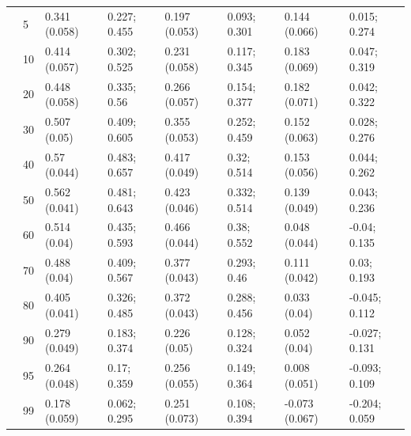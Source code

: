 \begin{landscape}
\begin{table}
{\begin{tabular}[t]{llllllll}
 & 5 & 0.341 (0.058) & 0.227; 0.455 & 0.197 (0.053) & 0.093; 0.301 & 0.144 (0.066) & 0.015; 0.274\\
 & 10 & 0.414 (0.057) & 0.302; 0.525 & 0.231 (0.058) & 0.117; 0.345 & 0.183 (0.069) & 0.047; 0.319\\
 & 20 & 0.448 (0.058) & 0.335; 0.56 & 0.266 (0.057) & 0.154; 0.377 & 0.182 (0.071) & 0.042; 0.322\\
 & 30 & 0.507 (0.05) & 0.409; 0.605 & 0.355 (0.053) & 0.252; 0.459 & 0.152 (0.063) & 0.028; 0.276\\
 & 40 & 0.57 (0.044) & 0.483; 0.657 & 0.417 (0.049) & 0.32; 0.514 & 0.153 (0.056) & 0.044; 0.262\\
 & 50 & 0.562 (0.041) & 0.481; 0.643 & 0.423 (0.046) & 0.332; 0.514 & 0.139 (0.049) & 0.043; 0.236\\
 & 60 & 0.514 (0.04) & 0.435; 0.593 & 0.466 (0.044) & 0.38; 0.552 & 0.048 (0.044) & -0.04; 0.135\\
 & 70 & 0.488 (0.04) & 0.409; 0.567 & 0.377 (0.043) & 0.293; 0.46 & 0.111 (0.042) & 0.03; 0.193\\
 & 80 & 0.405 (0.041) & 0.326; 0.485 & 0.372 (0.043) & 0.288; 0.456 & 0.033 (0.04) & -0.045; 0.112\\
 & 90 & 0.279 (0.049) & 0.183; 0.374 & 0.226 (0.05) & 0.128; 0.324 & 0.052 (0.04) & -0.027; 0.131\\
 & 95 & 0.264 (0.048) & 0.17; 0.359 & 0.256 (0.055) & 0.149; 0.364 & 0.008 (0.051) & -0.093; 0.109\\
 & 99 & 0.178 (0.059) & 0.062; 0.295 & 0.251 (0.073) & 0.108; 0.394 & -0.073 (0.067) & -0.204; 0.059\\
\bottomrule
\end{tabular}}
\end{table}
\end{landscape}
